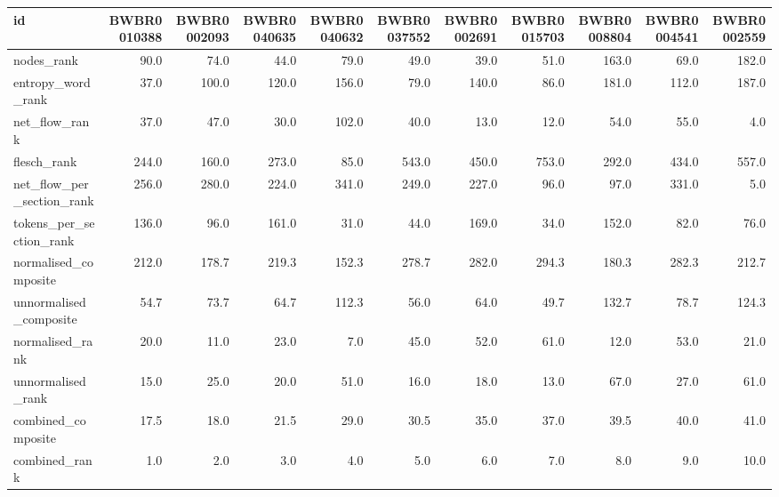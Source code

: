 \begin{tabular}{lrrrrrrrrrr}
\toprule
id & BWBR0010388 & BWBR0002093 & BWBR0040635 & BWBR0040632 & BWBR0037552 & BWBR0002691 & BWBR0015703 & BWBR0008804 & BWBR0004541 & BWBR0002559 \\
\midrule
nodes\_rank & 90.0 & 74.0 & 44.0 & 79.0 & 49.0 & 39.0 & 51.0 & 163.0 & 69.0 & 182.0 \\
\cline{1-11}
entropy\_word\_rank & 37.0 & 100.0 & 120.0 & 156.0 & 79.0 & 140.0 & 86.0 & 181.0 & 112.0 & 187.0 \\
\cline{1-11}
net\_flow\_rank & 37.0 & 47.0 & 30.0 & 102.0 & 40.0 & 13.0 & 12.0 & 54.0 & 55.0 & 4.0 \\
\cline{1-11}
flesch\_rank & 244.0 & 160.0 & 273.0 & 85.0 & 543.0 & 450.0 & 753.0 & 292.0 & 434.0 & 557.0 \\
\cline{1-11}
net\_flow\_per\_section\_rank & 256.0 & 280.0 & 224.0 & 341.0 & 249.0 & 227.0 & 96.0 & 97.0 & 331.0 & 5.0 \\
\cline{1-11}
tokens\_per\_section\_rank & 136.0 & 96.0 & 161.0 & 31.0 & 44.0 & 169.0 & 34.0 & 152.0 & 82.0 & 76.0 \\
\cline{1-11}
normalised\_composite & 212.0 & 178.7 & 219.3 & 152.3 & 278.7 & 282.0 & 294.3 & 180.3 & 282.3 & 212.7 \\
\cline{1-11}
unnormalised\_composite & 54.7 & 73.7 & 64.7 & 112.3 & 56.0 & 64.0 & 49.7 & 132.7 & 78.7 & 124.3 \\
\cline{1-11}
normalised\_rank & 20.0 & 11.0 & 23.0 & 7.0 & 45.0 & 52.0 & 61.0 & 12.0 & 53.0 & 21.0 \\
\cline{1-11}
unnormalised\_rank & 15.0 & 25.0 & 20.0 & 51.0 & 16.0 & 18.0 & 13.0 & 67.0 & 27.0 & 61.0 \\
\cline{1-11}
combined\_composite & 17.5 & 18.0 & 21.5 & 29.0 & 30.5 & 35.0 & 37.0 & 39.5 & 40.0 & 41.0 \\
\cline{1-11}
combined\_rank & 1.0 & 2.0 & 3.0 & 4.0 & 5.0 & 6.0 & 7.0 & 8.0 & 9.0 & 10.0 \\
\cline{1-11}
\bottomrule
\end{tabular}
